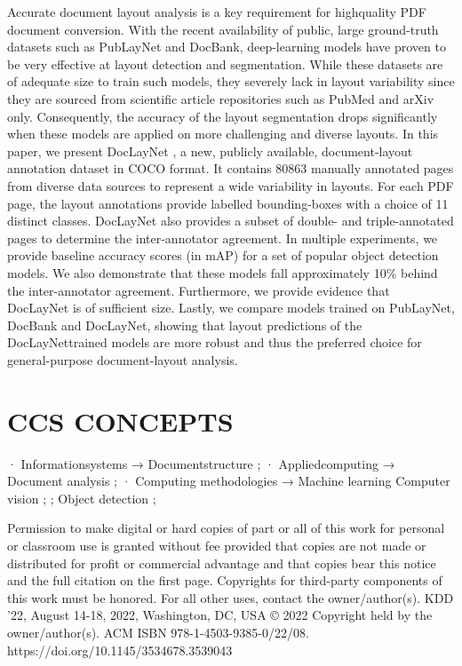 \documentclass[11pt,a4paper]{article}
\begin{document}
Accurate document layout analysis is a key requirement for highquality PDF document conversion. With the recent availability of public, large ground-truth datasets such as PubLayNet and DocBank, deep-learning models have proven to be very effective at layout detection and segmentation. While these datasets are of adequate size to train such models, they severely lack in layout variability since they are sourced from scientific article repositories such as PubMed and arXiv only. Consequently, the accuracy of the layout segmentation drops significantly when these models are applied on more challenging and diverse layouts. In this paper, we present DocLayNet , a new, publicly available, document-layout annotation dataset in COCO format. It contains 80863 manually annotated pages from diverse data sources to represent a wide variability in layouts. For each PDF page, the layout annotations provide labelled bounding-boxes with a choice of 11 distinct classes. DocLayNet also provides a subset of double- and triple-annotated pages to determine the inter-annotator agreement. In multiple experiments, we provide baseline accuracy scores (in mAP) for a set of popular object detection models. We also demonstrate that these models fall approximately 10\% behind the inter-annotator agreement. Furthermore, we provide evidence that DocLayNet is of sufficient size. Lastly, we compare models trained on PubLayNet, DocBank and DocLayNet, showing that layout predictions of the DocLayNettrained models are more robust and thus the preferred choice for general-purpose document-layout analysis.

\section{CCS CONCEPTS}

· Informationsystems → Documentstructure ; · Appliedcomputing → Document analysis ; · Computing methodologies → Machine learning Computer vision ; ; Object detection ;

Permission to make digital or hard copies of part or all of this work for personal or classroom use is granted without fee provided that copies are not made or distributed for profit or commercial advantage and that copies bear this notice and the full citation on the first page. Copyrights for third-party components of this work must be honored. For all other uses, contact the owner/author(s). KDD '22, August 14-18, 2022, Washington, DC, USA © 2022 Copyright held by the owner/author(s). ACM ISBN 978-1-4503-9385-0/22/08. https://doi.org/10.1145/3534678.3539043
\end{document}
